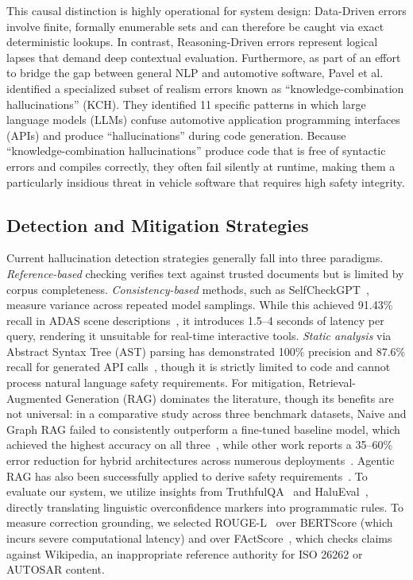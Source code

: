 \documentclass[conference,a4paper]{IEEEtran}
\begin{document}
This causal distinction is highly operational for system design: Data-Driven errors involve finite, formally enumerable sets and can therefore be caught via exact deterministic lookups. In contrast, Reasoning-Driven errors represent logical lapses that demand deep contextual evaluation.
Furthermore, as part of an effort to bridge the gap between general NLP and automotive software, Pavel et al.~\cite{ref4} identified a specialized subset of realism errors known as ``knowledge-combination hallucinations'' (KCH). They identified 11 specific patterns in which large language models (LLMs) confuse automotive application programming interfaces (APIs) and produce ``hallucinations'' during code generation. Because ``knowledge-combination hallucinations'' produce code that is free of syntactic errors and compiles correctly, they often fail silently at runtime, making them a particularly insidious threat in vehicle software that requires high safety integrity.
\subsection{Detection and Mitigation Strategies}
Current hallucination detection strategies generally fall into three paradigms. \emph{Reference-based} checking verifies text against trusted documents but is limited by corpus completeness. \emph{Consistency-based} methods, such as SelfCheckGPT~\cite{ref7}, measure variance across repeated model samplings. While this achieved 91.43\% recall in ADAS scene descriptions~\cite{ref8}, it introduces 1.5--4 seconds of latency per query, rendering it unsuitable for real-time interactive tools. \emph{Static analysis} via Abstract Syntax Tree (AST) parsing has demonstrated 100\% precision and 87.6\% recall for generated API calls~\cite{ref9}, though it is strictly limited to code and cannot process natural language safety requirements.
For mitigation, Retrieval-Augmented Generation (RAG) dominates the literature, though its benefits are not universal: in a comparative study across three benchmark datasets, Naive and Graph RAG failed to consistently outperform a fine-tuned baseline model, which achieved the highest accuracy on all three~\cite{ref11}, while other work reports a 35--60\% error reduction for hybrid architectures across numerous deployments~\cite{ref3}. Agentic RAG has also been successfully applied to derive safety requirements~\cite{ref5}. To evaluate our system, we utilize insights from TruthfulQA~\cite{ref12} and HaluEval~\cite{ref13}, directly translating linguistic overconfidence markers into programmatic rules. To measure correction grounding, we selected ROUGE-L~\cite{rouge} over BERTScore (which incurs severe computational latency) and over FActScore~\cite{ref10}, which checks claims against Wikipedia, an inappropriate reference authority for ISO 26262 or AUTOSAR content.
\end{document}
